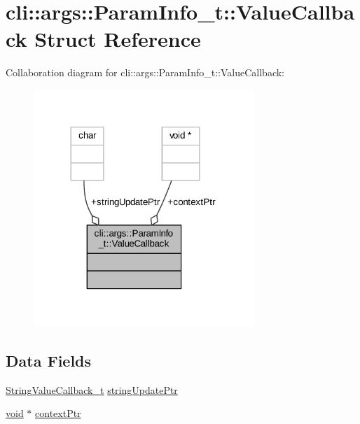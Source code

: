 \hypertarget{structcli_1_1args_1_1_param_info__t_1_1_value_callback}{}\section{cli\+:\+:args\+:\+:Param\+Info\+\_\+t\+:\+:Value\+Callback Struct Reference}
\label{structcli_1_1args_1_1_param_info__t_1_1_value_callback}


Collaboration diagram for cli\+:\+:args\+:\+:Param\+Info\+\_\+t\+:\+:Value\+Callback\+:
\nopagebreak
\begin{figure}[H]
\begin{center}
\leavevmode
\includegraphics[width=236pt]{structcli_1_1args_1_1_param_info__t_1_1_value_callback__coll__graph}
\end{center}
\end{figure}
\subsection*{Data Fields}
\begin{DoxyCompactItemize}
\item 
\hyperlink{namespacecli_1_1args_aa08565ab872ff119b0a21d4bbe1d8e4e}{String\+Value\+Callback\+\_\+t} \hyperlink{structcli_1_1args_1_1_param_info__t_1_1_value_callback_a616a10b233e192d579ec3f4d8ec4fa82}{string\+Update\+Ptr}
\item 
\hyperlink{_t_e_m_p_l_a_t_e__cdef_8h_ac9c84fa68bbad002983e35ce3663c686}{void} $\ast$ \hyperlink{structcli_1_1args_1_1_param_info__t_1_1_value_callback_a2c4d109fe50b8c8f31fde7a891dd5159}{context\+Ptr}
\end{DoxyCompactItemize}



